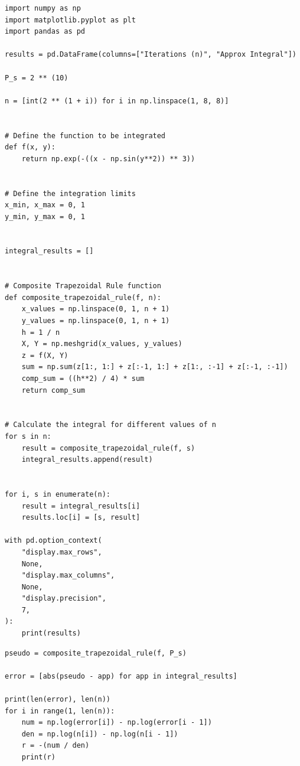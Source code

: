 \documentclass[12pt,
               a4paper,
               article,
               oneside,
               english,oldfontcommands]{memoir}
\begin{document}
\begin{lstlisting}[caption= Numerical Integral, label={lst: num int}]
import numpy as np
import matplotlib.pyplot as plt
import pandas as pd

results = pd.DataFrame(columns=["Iterations (n)", "Approx Integral"])

P_s = 2 ** (10)

n = [int(2 ** (1 + i)) for i in np.linspace(1, 8, 8)]


# Define the function to be integrated
def f(x, y):
    return np.exp(-((x - np.sin(y**2)) ** 3))


# Define the integration limits
x_min, x_max = 0, 1
y_min, y_max = 0, 1


integral_results = []


# Composite Trapezoidal Rule function
def composite_trapezoidal_rule(f, n):
    x_values = np.linspace(0, 1, n + 1)
    y_values = np.linspace(0, 1, n + 1)
    h = 1 / n
    X, Y = np.meshgrid(x_values, y_values)
    z = f(X, Y)
    sum = np.sum(z[1:, 1:] + z[:-1, 1:] + z[1:, :-1] + z[:-1, :-1])
    comp_sum = ((h**2) / 4) * sum
    return comp_sum


# Calculate the integral for different values of n
for s in n:
    result = composite_trapezoidal_rule(f, s)
    integral_results.append(result)


for i, s in enumerate(n):
    result = integral_results[i]
    results.loc[i] = [s, result]

with pd.option_context(
    "display.max_rows",
    None,
    "display.max_columns",
    None,
    "display.precision",
    7,
):
    print(results)
\end{lstlisting}
\begin{lstlisting}[caption= Error Estimation, label={lst: err est}]
pseudo = composite_trapezoidal_rule(f, P_s)

error = [abs(pseudo - app) for app in integral_results]

print(len(error), len(n))
for i in range(1, len(n)):
    num = np.log(error[i]) - np.log(error[i - 1])
    den = np.log(n[i]) - np.log(n[i - 1])
    r = -(num / den)
    print(r)
\end{lstlisting}
\end{document}
